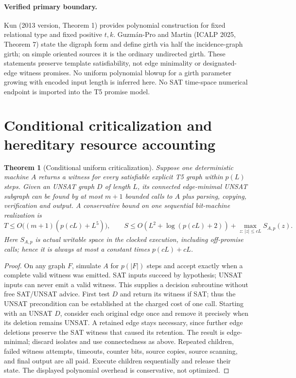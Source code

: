 \documentclass[11pt]{article}
\newtheorem{theorem}{Theorem}
\begin{document}
\paragraph{Verified primary boundary.}
Kun (2013 version, Theorem 1) provides polynomial construction for fixed
relational type and fixed positive $t,k$. Guzm\'an-Pro and Martin (ICALP 2025,
Theorem 7) state the digraph form and define girth via half the incidence-graph
girth; on simple oriented sources it is the ordinary undirected girth.
These statements preserve template satisfiability, not edge minimality or
designated-edge witness promises. No uniform polynomial blowup for a girth
parameter growing with encoded input length is inferred here. No SAT
time-space numerical endpoint is imported into the T5 promise model.

\section*{Conditional criticalization and hereditary resource accounting}
\begin{theorem}[Conditional uniform criticalization]
Suppose one deterministic machine $A$ returns a witness for \emph{every}
satisfiable explicit T5 graph within $p(L)$ steps. Given an UNSAT graph $D$
of length $L$, its connected edge-minimal UNSAT subgraph can be found by at
most $m+1$ bounded calls to $A$ plus parsing, copying, verification and output.
A conservative bound on one sequential bit-machine realization is
\[
 T\le O\bigl((m+1)(p(cL)+L^5)\bigr),\qquad
 S\le O(L^2+\log(p(cL)+2))+\max_{z:\,|z|\le cL} S_{A,p}(z).
\]
Here $S_{A,p}$ is actual writable space in the clocked execution, including
off-promise calls; hence it is always at most a constant times $p(cL)+cL$.
\end{theorem}
\begin{proof}
On any graph $F$, simulate $A$ for $p(|F|)$ steps and accept exactly when a
complete valid witness was emitted. SAT inputs succeed by hypothesis; UNSAT
inputs can never emit a valid witness. This supplies a decision subroutine
without free SAT/UNSAT advice. First test $D$ and return its witness if SAT;
thus the UNSAT precondition can be established at the charged cost of one call.
Starting with an UNSAT $D$, consider each original edge
once and remove it precisely when its deletion remains UNSAT. A retained
edge stays necessary, since further edge deletions preserve the SAT witness
that caused its retention. The result is edge-minimal; discard isolates and
use connectedness as above. Repeated children, failed witness attempts,
timeouts, counter bits, source copies, source scanning, and final output are
all paid. Execute children sequentially and release their state. The displayed
polynomial overhead is conservative, not optimized.
\end{proof}
\end{document}

